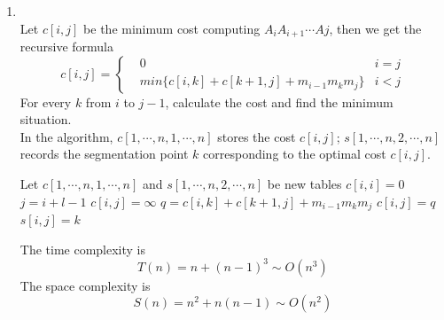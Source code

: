 \documentclass[12pt,a4paper]{article}
\makeatletter
\newtheorem*{solution}{Solution}
\theoremstyle{definition}
\renewenvironment{solution}[1][Solution] {\par\pushQED{\qed}\normalfont\topsep6\p@\@plus6\p@\relax\trivlist\item[\hskip\labelsep\bfseries#1\@addpunct{.}]\ignorespaces}{\popQED\endtrivlist\@endpefalse} \makeatother
\makeatother
\begin{document}
\begin{enumerate}
	    \begin{solution}
	        \quad \\
	        Let $c[i,j]$ be the minimum cost computing $A_iA_{i+1}\cdots Aj$, then we get the recursive formula
	        $$
	        c[i,j] = \left\{
	        \begin{aligned}
	        	& 0 & i = j \\
	        	& min\{c[i,k] + c[k+1,j] + m_{i-1}m_km_j\} & i<j
	        \end{aligned}
	        \right.
	        $$
	        For every $k$ from $i$ to $j-1$, calculate the cost and find the minimum situation.\\
	        In the algorithm, 
	        $c[1,\cdots,n,1,\cdots,n]$ stores the cost $c[i,j]$;  $s[1,\cdots,n,2,\cdots,n]$ records the segmentation point $k$ corresponding to the optimal cost $c[i,j]$. \\
	        \begin{algorithm}[H]
	        	\BlankLine
	        	\caption{$minCost(array[m_1,...,m_{n+1}])$} \label{Alg-div}
	        	Let $c[1,\cdots,n,1,\cdots,n]$ and $s[1,\cdots,n,2,\cdots,n]$ be new tables\;
	        	{
	        		$c[i,i] = 0$\;
	        	}
        		{
        			{
        				$j = i+l-1$\;
        				$c[i,j] = \infty$\;
        				{
        					$q = c[i,k]+c[k+1,j]+m_{i-1}m_km_j$\;
        					{
        						$c[i,j] = q$\;
        						$s[i,j] = k$\;
        					}
        				}
        			}
        		}
	        	\;      	
	        \end{algorithm}
        The time complexity is 
        \[
        	T(n) = n + (n-1)^3 \sim O(n^3)
        \]
        The space complexity is 
        \[
        	S(n) = n^2 + n(n-1) \sim O(n^2)
        \]
	    \end{solution}
	

\end{enumerate}
\end{document}
